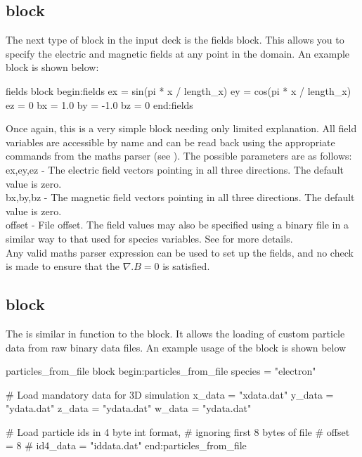 \subsection{\texorpdfstring
  { block}
  {           {fields} block}}
\label{sec:fields_block}
The next type of block in the {\EPOCH} input deck is the fields block. This
allows you to specify the electric and magnetic fields at any point in the
domain. An example block is shown below:
\begin{lboxverbatim}{fields block}
begin:fields
   ex = sin(pi * x / length_x)
   ey = cos(pi * x / length_x)
   ez = 0
   bx = 1.0
   by = -1.0
   bz = 0
end:fields
\end{lboxverbatim}

Once again, this is a very simple block needing only limited
explanation. All field variables are accessible by name and can be read back
using the appropriate commands from the maths parser (see ).
The possible parameters are as follows:\\

{\emphtext ex,\;ey,\;ez} - The electric field vectors pointing in all three
directions. The default value is zero.\\

{\emphtext bx,\;by,\;bz} - The magnetic field vectors pointing in all three
directions. The default value is zero.\\

{\emphtext offset} - File offset. The field values may also be specified using
a binary file in a similar way to that used for species variables. See
 for more details.\\

Any valid maths parser expression can be used to set up the fields, and no
check is made to ensure that the $\nabla.B = 0$ is satisfied.


\subsection{\texorpdfstring
  { block}
  {           {particles\_from\_file} block}}
\label{sec:particles_from_file}
The  is similar in function to the
 block. It allows the loading of custom particle data from raw
binary data files. An example usage of the block is shown below
\begin{lboxverbatim}{particles\_from\_file block}
begin:particles_from_file
   species = "electron"

   # Load mandatory data for 3D simulation
   x_data = "xdata.dat"
   y_data = "ydata.dat"
   z_data = "ydata.dat"
   w_data = "ydata.dat"

   # Load particle ids in 4 byte int format,
   # ignoring first 8 bytes of file
   # offset = 8
   # id4_data = "iddata.dat"
end:particles_from_file
\end{lboxverbatim}

